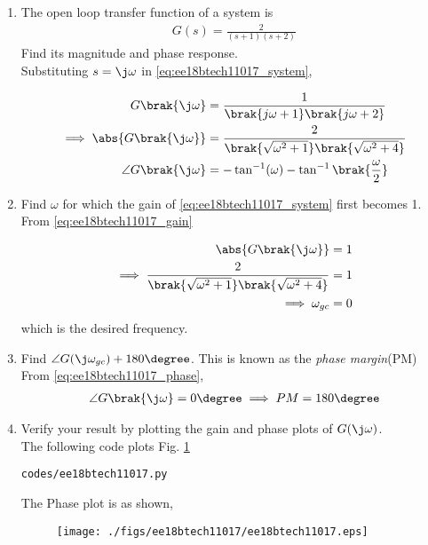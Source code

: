 \begin{enumerate}[label=\thesection.\arabic*.,ref=\thesection.\theenumi]

\item The open loop transfer function of a system is 
\begin{align}
G(s) = \frac{2}{(s+1)(s+2)}
\label{eq:ee18btech11017_system}
\end{align}
Find its magnitude and phase response.
\\
\solution Substituting $s = \j\omega$ in \eqref{eq:ee18btech11017_system},

\begin{align}
G\brak{\j\omega}&=\frac{1}{\brak{j\omega+1}\brak{j\omega+2}} 
\\
\implies 
\abs{G\brak{\j\omega}}&=\frac{2}{\brak{\sqrt{\omega^2+1}}\brak{\sqrt{\omega^2+4}}}
\label{eq:ee18btech11017_gain}
\\
\angle G\brak{\j\omega}&=- \tan^{-1}(\omega) - \tan^{-1}\brak{\frac{\omega}{2}} 
\label{eq:ee18btech11017_phase}
\end{align}

\item Find $\omega$ for which the gain of \eqref{eq:ee18btech11017_system} first becomes 1.
\\
\solution From \eqref{eq:ee18btech11017_gain}

\begin{align}
\abs{G\brak{\j\omega}}&=1
\\
\implies \frac{2}{\brak{\sqrt{\omega^2+1}}\brak{\sqrt{\omega^2+4}}}&=1
\\
\implies \omega_{gc}&=0
\end{align}
which is the desired frequency.

\item Find $\angle G(\j\omega_{gc}) + 180\degree$.  This is known as the {\em phase margin}(PM)
\\
\solution From \eqref{eq:ee18btech11017_phase},
%
\begin{align}
\angle G\brak{\j\omega} = 0\degree
\implies PM=180\degree
\label{eq:ee18btech11017_pm}
\end{align}
%
\item Verify your result by plotting the gain and phase plots of $G(\j\omega)$.
\\
\solution The following code plots Fig. \ref{fig:ee18btech11017}

\begin{lstlisting}
codes/ee18btech11017.py
\end{lstlisting}
%
The Phase plot is as shown,
\begin{figure}[!h]
  \texttt{[image: ./figs/ee18btech11017/ee18btech11017.eps]}
  \caption{}
  \label{fig:ee18btech11017}
\end{figure}


\end{enumerate}
